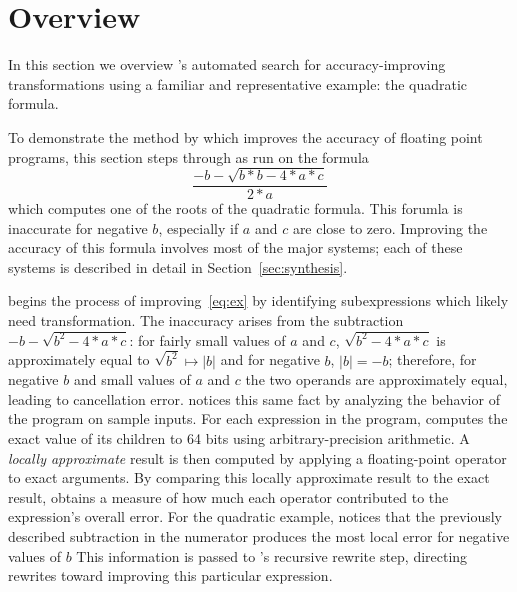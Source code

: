 \documentclass[paper.tex]{subfiles}
\begin{document}
\section{Overview}
\label{sec:overview}

In this section we overview \casio's automated search for
accuracy-improving transformations using a familiar and representative
example: the quadratic formula.

To demonstrate the method by which \casio improves the accuracy of
floating point programs, this section steps through \casio as run on
the formula
\begin{equation}\label{eq:ex}
  \frac{-b - \sqrt{b*b - 4*a*c}}
       {2*a}
\end{equation}
which computes one of the roots of the quadratic formula.  This
forumla is inaccurate for negative $b$, especially if $a$ and $c$ are
close to zero.  Improving the accuracy of this formula involves most
of the major systems; each of these systems is described in detail in
Section~\ref{sec:synthesis}.

\casio begins the process of improving~\eqref{eq:ex} by identifying
subexpressions which likely need transformation.  The inaccuracy
arises from the subtraction $-b - \sqrt{b^2 - 4*a*c}$: for fairly
small values of $a$ and $c$, $\sqrt{b^2 - 4*a*c}$ is approximately
equal to $\sqrt{b^2} \mapsto |b|$ and for negative $b$, $|b| = -b$;
therefore, for negative $b$ and small values of $a$ and $c$ the two
operands are approximately equal, leading to cancellation error.
\casio notices this same fact by analyzing the behavior of the program
on sample inputs.  For each expression in the program, \casio computes
the exact value of its children to 64 bits using arbitrary-precision
arithmetic.  A \emph{locally approximate} result is then computed by
applying a floating-point operator to exact arguments.  By comparing
this locally approximate result to the exact result, \casio obtains a
measure of how much each operator contributed to the expression's
overall error.  For the quadratic example, \casio notices that the
previously described subtraction in the numerator produces the most
local error for negative values of $b$ This information is passed to
\casio's recursive rewrite step, directing rewrites toward improving
this particular expression.
\end{document}
